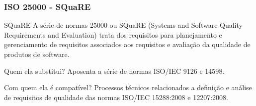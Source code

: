\begin{frame}[parent={ie:agenda}, hasnext=false, hasprev=false]
	\frametitle{ISO 25000 - SQuaRE}

	\begin{block:concept}{SQuaRE}
		A série de normas 25000 ou SQuaRE (Systems and Software Quality Requirements
		and Evaluation) trata dos requisitos para planejamento e gerenciamento de
		requisitos associados aos requisitos e avaliação da qualidade de produtos
		de software.
	\end{block:concept}

	\begin{block:fact}{Quem ela substitui?}
		Aposenta a série de normas ISO/IEC 9126 e 14598.
	\end{block:fact}
	
	\begin{block:fact}{Com quem ela é compatível?}
		Processos técnicos relacionados a definição e análise de requisitos de
		qualidade das normas ISO/IEC 15288:2008 e 12207:2008.
	\end{block:fact}
		
\end{frame}


